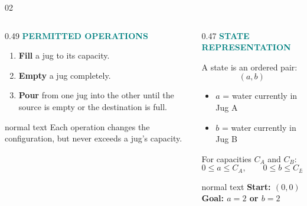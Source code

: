 \documentclass[aspectratio=169,10pt]{beamer}
\newcommand{\slideheading}[2]{%
  {\fontfamily{phv}\fontseries{b}\selectfont\textcolor{DeepNavy}{#1}}%
  \hspace{0.16cm}{\fontfamily{phv}\fontseries{m}\selectfont\textcolor{Teal}{/}}%
  \hspace{0.16cm}{\fontfamily{phv}\fontseries{b}\selectfont\textcolor{DeepNavy}{#2}}%
}
\newcommand{\smalllabel}[1]{\textcolor{Teal}{\bfseries\scriptsize #1}}
\begin{document}
\begin{frame}{\slideheading{02}{Permitted operations and state representation}}
  \begin{columns}[T,onlytextwidth]
    \begin{column}{0.49\textwidth}
      \smalllabel{PERMITTED OPERATIONS}\par\vspace{0.12cm}
      \begin{enumerate}
        \item \textbf{Fill} a jug to its capacity.
        \item \textbf{Empty} a jug completely.
        \item \textbf{Pour} from one jug into the other until the source is empty or the destination is full.
      \end{enumerate}
      \vspace{0.2cm}
      \begin{beamercolorbox}[rounded=true,sep=7pt,wd=\linewidth]{normal text}
        \color{Muted}\small Each operation changes the configuration, but never exceeds a jug's capacity.
      \end{beamercolorbox}
    \end{column}
    \begin{column}{0.47\textwidth}
      \smalllabel{STATE REPRESENTATION}\par\vspace{0.12cm}
      A state is an ordered pair:
      \[
        (a,b)
      \]
      \begin{itemize}
        \item $a$ = water currently in Jug A
        \item $b$ = water currently in Jug B
      \end{itemize}
      For capacities $C_A$ and $C_B$:
      \[
        0\leq a\leq C_A,\qquad 0\leq b\leq C_B
      \]
      \vspace{0.1cm}
      \begin{beamercolorbox}[rounded=true,sep=7pt,wd=\linewidth]{normal text}
        \centering\color{DeepNavy}\bfseries Start: $(0,0)$\qquad\bfseries Goal: $a=2$ or $b=2$
      \end{beamercolorbox}
    \end{column}
  \end{columns}
\end{frame}
\end{document}

